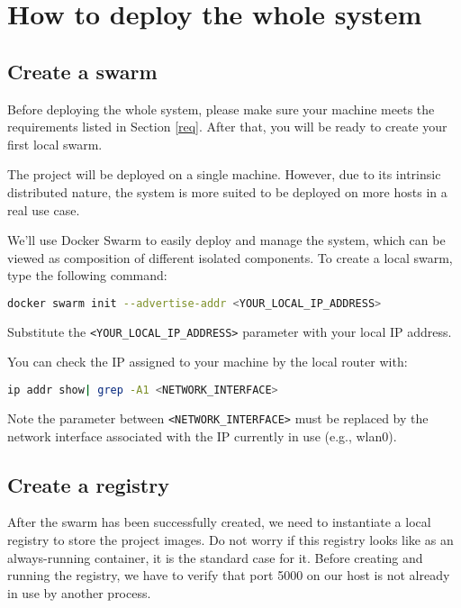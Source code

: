 \section{How to deploy the whole system}\label{sec:sys}

\subsection{Create a swarm}\label{sec:sys-swarm}

Before deploying the whole system, please make sure your machine meets the
requirements listed in Section \ref{req}.
After that, you will be ready to create your first local swarm.

The project will be deployed on a single machine. However, due to its intrinsic
distributed nature, the system is more suited to be deployed on more hosts in
a real use case.

We'll use Docker Swarm to easily deploy and manage the system, which can be
viewed as composition of different isolated components.
To create a local swarm, type the following command:

\begin{lstlisting}[language=bash]
docker swarm init --advertise-addr <YOUR_LOCAL_IP_ADDRESS>
\end{lstlisting}

Substitute the \texttt{<YOUR\_LOCAL\_IP\_ADDRESS>} parameter with your local
IP address.

You can check the IP assigned to your machine by the local router with:

\begin{lstlisting}[language=bash]
ip addr show| grep -A1 <NETWORK_INTERFACE>
\end{lstlisting}

Note the parameter between \texttt{<NETWORK\_INTERFACE>} must
be replaced by the network interface associated with the IP currently in use
(e.g., wlan0).



\subsection{Create a registry}

After the swarm has been successfully created, we need to instantiate a local
registry to store the project images. Do not worry if this registry looks like
as an always-running container, it is the standard case for it.
Before creating and running the registry, we have to verify that port 5000
on our host is not already in use by another process.

